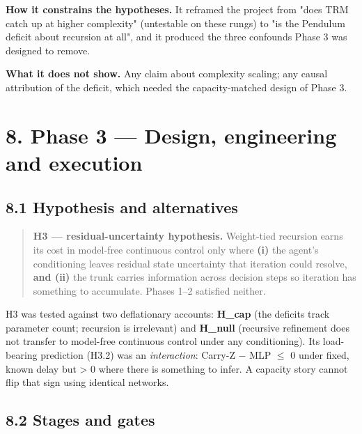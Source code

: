 \documentclass[11pt]{article}
\begin{document}
\textbf{How it constrains the hypotheses.} It reframed the project from "does TRM catch up at higher complexity" (untestable on these rungs) to "is the Pendulum deficit about recursion at all", and it produced the three confounds Phase 3 was designed to remove.



\textbf{What it does not show.} Any claim about complexity scaling; any causal attribution of the deficit, which needed the capacity-matched design of Phase 3.





\medskip



\section*{8. Phase 3 --- Design, engineering and execution}



\subsection*{8.1 Hypothesis and alternatives}



\begin{quote}\textbf{H3 --- residual-uncertainty hypothesis.} Weight-tied recursion earns its cost in model-free continuous control only where \textbf{(i)} the agent's conditioning leaves residual state uncertainty that iteration could resolve, \textbf{and (ii)} the trunk carries information across decision steps so iteration has something to accumulate. Phases 1--2 satisfied neither.\end{quote}



H3 was tested against two deflationary accounts: \textbf{H\_cap} (the deficits track parameter count; recursion is irrelevant) and \textbf{H\_null} (recursive refinement does not transfer to model-free continuous control under any conditioning). Its load-bearing prediction (H3.2) was an \emph{interaction}: Carry-Z $-$ MLP $\leq$ 0 under fixed, known delay but > 0 where there is something to infer. A capacity story cannot flip that sign using identical networks.



\subsection*{8.2 Stages and gates}
\end{document}
